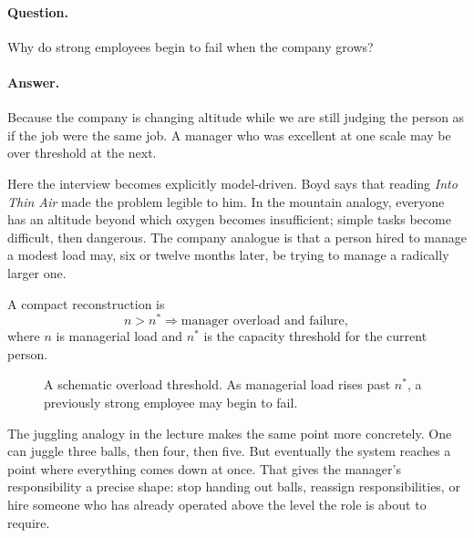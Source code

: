 \paragraph{Question.} Why do strong employees begin to fail when the company grows?

\paragraph{Answer.} Because the company is changing altitude while we are still judging the person as if the job were the same job. A manager who was excellent at one scale may be over threshold at the next.

Here the interview becomes explicitly model-driven. Boyd says that reading \emph{Into Thin Air} made the problem legible to him. In the mountain analogy, everyone has an altitude beyond which oxygen becomes insufficient; simple tasks become difficult, then dangerous. The company analogue is that a person hired to manage a modest load may, six or twelve months later, be trying to manage a radically larger one.

A compact reconstruction is
\begin{equation}
n>n^{*} \Rightarrow \text{manager overload and failure},
\end{equation}
where \(n\) is managerial load and \(n^{*}\) is the capacity threshold for the current person.

\begin{figure}[h]
\centering
{}
\caption{A schematic overload threshold. As managerial load rises past $n^{*}$, a previously strong employee may begin to fail.}
\end{figure}

The juggling analogy in the lecture makes the same point more concretely. One can juggle three balls, then four, then five. But eventually the system reaches a point where everything comes down at once. That gives the manager's responsibility a precise shape: stop handing out balls, reassign responsibilities, or hire someone who has already operated above the level the role is about to require.

